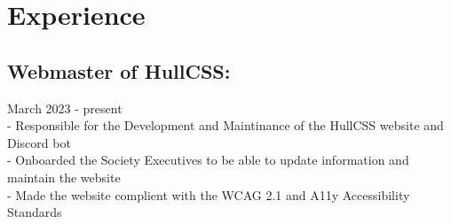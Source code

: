 \section{Experience}

\subsection{Webmaster of HullCSS:} March 2023 - present \\
\:-\: Responsible for the Development and Maintinance of the HullCSS website and Discord bot \\
\:-\: Onboarded the Society Executives to be able to update information and maintain the website \\
\:-\: Made the website complient with the WCAG 2.1 and A11y Accessibility Standards \\